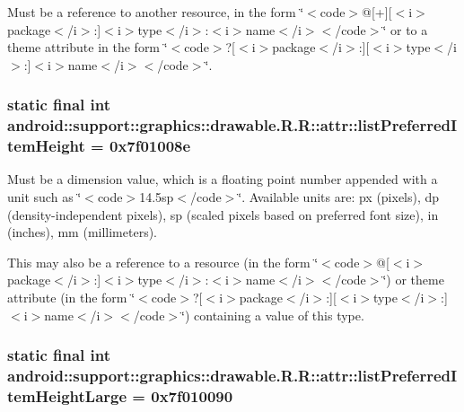 Must be a reference to another resource, in the form \char`\"{}$<$code$>$@\mbox{[}+\mbox{]}\mbox{[}$<$i$>$package$<$/i$>$:\mbox{]}$<$i$>$type$<$/i$>$:$<$i$>$name$<$/i$>$$<$/code$>$\char`\"{} or to a theme attribute in the form \char`\"{}$<$code$>$?\mbox{[}$<$i$>$package$<$/i$>$:\mbox{]}\mbox{[}$<$i$>$type$<$/i$>$:\mbox{]}$<$i$>$name$<$/i$>$$<$/code$>$\char`\"{}. \hypertarget{classandroid_1_1support_1_1graphics_1_1drawable_1_1_r_1_1attr_83278ad7099882e44e48ab7f94d71b91}{
\subsubsection[{listPreferredItemHeight}]{\setlength{\rightskip}{0pt plus 5cm}static final int android::support::graphics::drawable.R.R::attr::listPreferredItemHeight = 0x7f01008e}}
\label{classandroid_1_1support_1_1graphics_1_1drawable_1_1_r_1_1attr_83278ad7099882e44e48ab7f94d71b91}


Must be a dimension value, which is a floating point number appended with a unit such as \char`\"{}$<$code$>$14.5sp$<$/code$>$\char`\"{}. Available units are: px (pixels), dp (density-independent pixels), sp (scaled pixels based on preferred font size), in (inches), mm (millimeters). 

This may also be a reference to a resource (in the form \char`\"{}$<$code$>$@\mbox{[}$<$i$>$package$<$/i$>$:\mbox{]}$<$i$>$type$<$/i$>$:$<$i$>$name$<$/i$>$$<$/code$>$\char`\"{}) or theme attribute (in the form \char`\"{}$<$code$>$?\mbox{[}$<$i$>$package$<$/i$>$:\mbox{]}\mbox{[}$<$i$>$type$<$/i$>$:\mbox{]}$<$i$>$name$<$/i$>$$<$/code$>$\char`\"{}) containing a value of this type. \hypertarget{classandroid_1_1support_1_1graphics_1_1drawable_1_1_r_1_1attr_ae2a6ff372f951079bfeff924e6a17b1}{
\subsubsection[{listPreferredItemHeightLarge}]{\setlength{\rightskip}{0pt plus 5cm}static final int android::support::graphics::drawable.R.R::attr::listPreferredItemHeightLarge = 0x7f010090}}
\label{classandroid_1_1support_1_1graphics_1_1drawable_1_1_r_1_1attr_ae2a6ff372f951079bfeff924e6a17b1}


